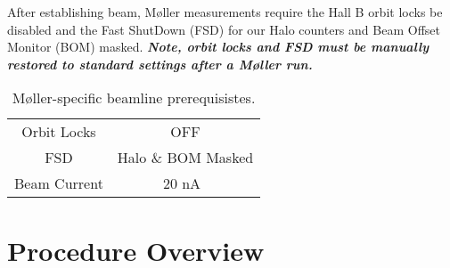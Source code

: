 \documentclass[amsmath,amssymb,notitlepage,12pt]{revtex4}
\newcommand{\ibeam}{20 nA\ }
\begin{document}
After establishing beam, M{\o}ller measurements require the Hall B orbit locks be disabled and the Fast ShutDown (FSD) for our Halo counters and Beam Offset Monitor (BOM) masked.  {\bf\em Note, orbit locks and FSD must be manually restored to standard settings after a M{\o}ller run.}

\begin{table}[htbp]\centering
    \begin{tabular}{c|c}\toprule[1.5pt]
        Orbit Locks & OFF\\
        FSD & Halo \& BOM Masked\\
        Beam Current & \ibeam \\
        \bottomrule[1.5pt]
    \end{tabular}
    \caption{M{\o}ller-specific beamline prerequisistes.}
\end{table}

\newpage

\section{Procedure Overview}\label{sec:procedure}
\end{document}
